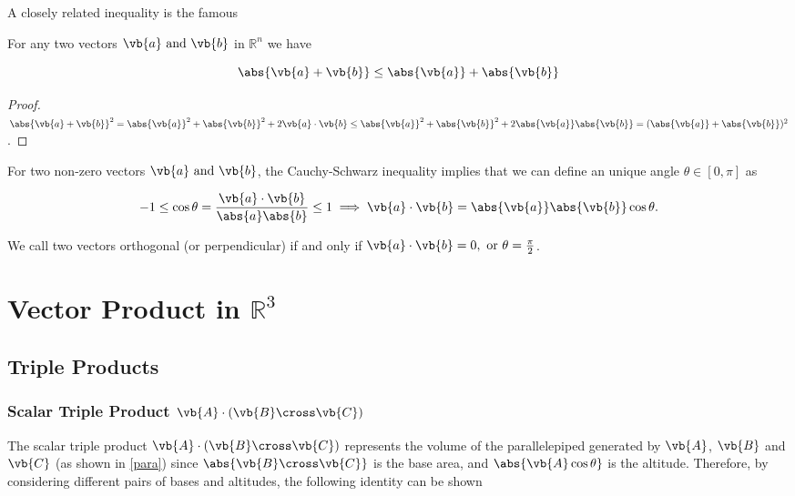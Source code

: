 \documentclass[a4paper,12pt]{report}
\begin{document}
A closely related inequality is the famous

\begin{lemma}
For any two vectors \(\vb{a} \text { and } \vb{b} \) in \(\mathbb{R}^{n} \) we have

\begin{equation}
    \abs{\vb{a} + \vb{b} } \le \abs{\vb{a} } + \abs{\vb{b} }   
\end{equation}
\end{lemma}

\begin{proof}
\(\abs{\vb{a} +\vb{b} }^2 = \abs{\vb{a} }^2 + \abs{\vb{b} }^2 + 2 \vb{a} \cdot \vb{b} \le \abs{\vb{a} }^2 + \abs{\vb{b} }^2 + 2\abs{\vb{a} }\abs{\vb{b} } = (\abs{\vb{a} } + \abs{\vb{b} }  )^2      \). 
\end{proof}

For two non-zero vectors \(\vb{a} \text { and } \vb{b} \), the Cauchy-Schwarz inequality implies that we can define an unique angle \(\theta \in [0,\pi ]\) as

\begin{equation}
    -1 \le \cos \theta = \frac{\vb{a} \cdot \vb{b} }{\abs{a}\abs{b}  } \le 1 \implies \vb{a} \cdot \vb{b} = \abs{\vb{a} } \abs{\vb{b} }\cos \theta .  
\end{equation}

We call two vectors orthogonal (or perpendicular) if and only if \(\vb{a} \cdot \vb{b} = 0, \text { or }  \theta = \frac{\pi }{2} \).

\section{Vector Product in \(\mathbb{R}^3 \) }

\subsection{Triple Products}
	
\subsubsection{Scalar Triple Product \(\vb{A} \cdot (\vb{B} \cross \vb{C})\)}
	
The scalar triple product \(\vb{A} \cdot (\vb{B} \cross \vb{C})\) represents the volume of the parallelepiped generated by \(\vb{A}\), \(\vb{B}\) and \(\vb{C}\) (as shown in \cref{para}) since \(\abs{\vb{B} \cross \vb{C}}\) is the base area, and \(\abs{\vb{A}\cos{\theta}}\) is the altitude. Therefore, by considering different pairs of bases and altitudes, the following identity can be shown
	
\end{document}
